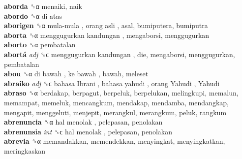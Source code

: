 \textbf{aborda} ␝α  menaiki, naik  \\
\textbf{abordo} ␝α   di atas   \\
\textbf{aborigen} ␝α   mula-mula ,  orang asli , asal, bumiputera, bumiputra  \\
\textbf{aborta} ␝α   menggugurkan kandungan , mengaborsi, menggugurkan  \\
\textbf{aborto} ␝α  pembatalan  \\
\textbf{abortá} \emph{adj}  ␝ϲ   menggugurkan kandungan , die, mengaborsi, menggugurkan, pembatalan  \\
\textbf{abou} ␝α   di bawah ,  ke bawah , bawah, meleset  \\
\textbf{abraiko} \emph{adj}  ␝ϲ   bahasa Ibrani ,  bahasa yahudi ,  orang Yahudi ,  Yahudi   \\
\textbf{abraso} ␝α  berdakap, berpagut, berpeluk, berpelukan, melingkupi, memalun, memampat, memeluk, mencangkum, mendakap, mendamba, mendangkap, mengapit, menggeluti, menjepit, merangkul, merangkum, peluk, rangkum  \\
\textbf{abrenuncia} ␝α   hal menolak , pelepasan, penolakan  \\
\textbf{abrenunsia} \emph{int}  ␝ϲ   hal menolak , pelepasan, penolakan  \\
\textbf{abrevia} ␝α  memandakkan, memendekkan, menyingkat, menyingkatkan, meringkaskan  \\
